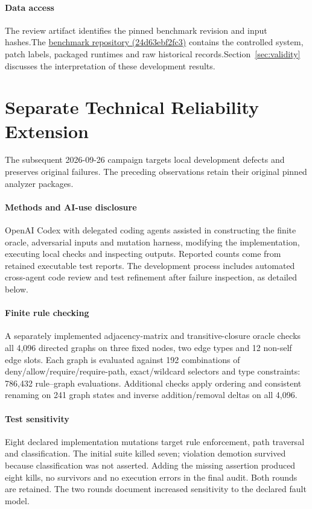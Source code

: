 \paragraph{Data access} \ifdefined\blindprofile The review artifact identifies the pinned benchmark revision and input hashes.\else The \href{https://github.com/Little-Boy-s-ArchSync/archsync-benchmark/tree/24d63ebf2fc3075a1d64f1eaff38cdc0b7f586fb}{benchmark repository (24d63ebf2fc3)} contains the controlled system, patch labels, packaged runtimes and raw historical records.\fi\space Section~\ref{sec:validity} discusses the interpretation of these development results.

\section{Separate Technical Reliability Extension}\label{sec:reliability}
The subsequent 2026-09-26 campaign targets local development defects and preserves original failures. The preceding observations retain their original pinned analyzer packages.

\paragraph{Methods and AI-use disclosure} OpenAI Codex with delegated coding agents assisted in constructing the finite oracle, adversarial inputs and mutation harness, modifying the implementation, executing local checks and inspecting outputs. Reported counts come from retained executable test reports. The development process includes automated cross-agent code review and test refinement after failure inspection, as detailed below.

\begin{sloppypar}
\paragraph{Finite rule checking} A separately implemented adjacency-matrix and transitive-closure oracle checks all 4,096 directed graphs on three fixed nodes, two edge types and 12 non-self edge slots. Each graph is evaluated against 192 combinations of deny/allow/require/require-path, exact/wildcard selectors and type constraints: 786,432 rule--graph evaluations. Additional checks apply ordering and consistent renaming on 241 graph states and inverse addition/removal deltas on all 4,096.
\end{sloppypar}

\paragraph{Test sensitivity} Eight declared implementation mutations target rule enforcement, path traversal and classification. The initial suite killed seven; violation demotion survived because classification was not asserted. Adding the missing assertion produced eight kills, no survivors and no execution errors in the final audit. Both rounds are retained. The two rounds document increased sensitivity to the declared fault model.

